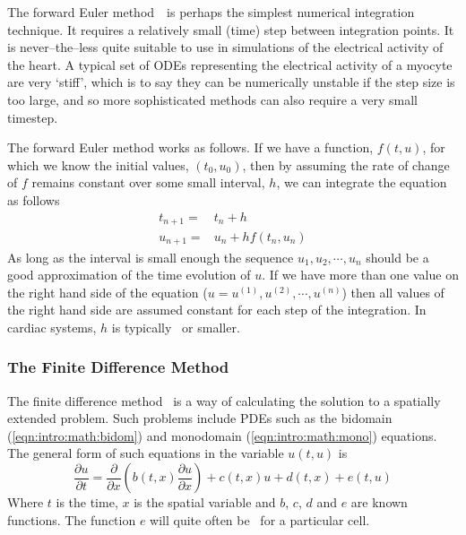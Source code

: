 The forward Euler method~\cite{Birkhoff1989}\ is perhaps the simplest numerical
integration technique.
It requires a relatively small (time) step between integration points.
It is never--the--less quite suitable to use in simulations of the electrical
activity of the heart.
A typical set of ODEs representing the electrical activity of a myocyte are very
`stiff', which is to say they can be numerically unstable if the step size is
too large, and so more sophisticated methods can also require a very small
timestep.

The forward Euler method works as follows.
If we have a function, $f(t, u)$, for which we know the initial
values, $(t_0, u_0)$, then by assuming the rate of change of $f$ remains constant
over some small interval, $h$, we can integrate the equation as follows
\begin{subequations}
\label{eqn:intro:euler}
\begin{align}
t_{n+1} = & t_n + h \label{eqn:intro:euler:t} \\
u_{n+1} = & u_n + hf(t_n, u_n) \label{eqn:intro:euler:x}
\end{align}
\end{subequations}
As long as the interval is small enough the sequence $u_1,u_2,\cdots,u_n$
should be a good approximation of the time evolution of $u$.
If we have more than one value on the right hand side of the equation ($u =
u^{(1)}, u^{(2)}, \cdots, u^{(n)}$) then all values of the right hand side are
assumed constant for each step of the integration.
In cardiac systems, $h$ is typically \ or smaller.

\subsubsection{The Finite Difference Method}

The finite difference method~\cite{Morton2005} is a way of calculating the
solution to a spatially extended problem.
Such problems include PDEs such as the bidomain (\ref{eqn:intro:math:bidom}) and
monodomain (\ref{eqn:intro:math:mono}) equations.
The general form of such equations in the variable $u(t, u)$ is
\begin{equation}
\label{eqn:intro:fd:partial}
\frac{\partial u}{\partial t} = \frac{\partial}{\partial x} \left( b(t, x)
\frac{\partial u}{\partial x} \right) + c(t, x)u + d(t, x) + e(t, u)
\end{equation}
Where $t$ is the time, $x$ is the spatial variable and $b$, $c$, $d$ and $e$ are
known functions.
The function $e$ will quite often be \ for a particular cell.

